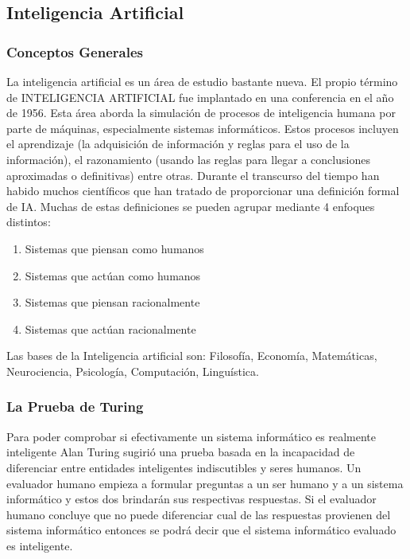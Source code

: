 \documentclass[a4paper]{article}
\begin{document}
\subsection{Inteligencia Artificial}
\subsubsection{Conceptos Generales}
La inteligencia artificial es un área de estudio bastante nueva. El propio término de INTELIGENCIA ARTIFICIAL fue implantado en una conferencia en el año de 1956. Esta área aborda la simulación de procesos de inteligencia humana por parte de máquinas, especialmente sistemas informáticos. Estos procesos incluyen el aprendizaje (la adquisición de información y reglas para el uso de la información), el razonamiento (usando las reglas para llegar a conclusiones aproximadas o definitivas) entre otras.
Durante el transcurso del tiempo han habido muchos científicos que han tratado de proporcionar una definición formal de IA. Muchas de estas definiciones se pueden agrupar mediante 4 enfoques distintos:

\begin{enumerate}
\item Sistemas que piensan como humanos
\item Sistemas que actúan como humanos
\item Sistemas que piensan racionalmente
\item Sistemas que actúan racionalmente
\end{enumerate}
Las bases de la Inteligencia artificial son: Filosofía, Economía, Matemáticas, Neurociencia, Psicología, Computación, Linguística.

\subsubsection*{La Prueba de Turing}
Para poder comprobar si efectivamente un sistema informático es realmente inteligente Alan Turing sugirió una prueba basada en la incapacidad de diferenciar entre entidades inteligentes indiscutibles y seres humanos. Un evaluador humano empieza a formular preguntas a un ser humano y a un sistema informático y estos dos brindarán sus respectivas respuestas. Si el evaluador humano concluye que no puede diferenciar cual de las respuestas provienen del sistema informático entonces se podrá decir que el sistema informático evaluado es inteligente.
\end{document}
